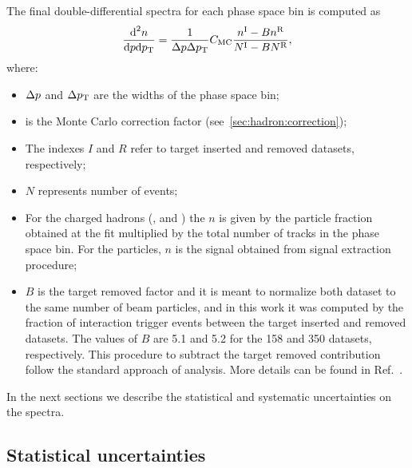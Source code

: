 The final double-differential spectra for each
phase space bin is computed as
\begin{equation}
  \frac{\text{d}^2n}{\text{d}p\text{d}p_\text{T}} = \frac{1}{\Delta p\Delta p_\text{T}} \mbox{$C_\text{MC}$}
  \frac{n^\text{I}-Bn^\text{R}}{N^\text{I}-BN^\text{R}},
  \label{eq:hadron:spec}
\end{equation}
where:
\begin{itemize}

\item $\Delta p$ and $\Delta p_\text{T}$ are the widths of the phase space bin;

\item \cmc is the Monte Carlo correction factor (see~\cref{sec:hadron:correction});

\item The indexes $I$ and $R$ refer to target inserted and removed datasets, respectively;
  
\item $N$ represents number of events;

\item  For the charged hadrons (\pions, \kaons and \protons)
the $n$ is given by the particle fraction obtained at the \dedx fit multiplied
by the total number of tracks in the phase space bin.
For the \vzero particles, $n$ is the signal obtained
from signal extraction procedure;

\item $B$ is the target removed factor and it is meant to normalize both dataset to the same
number of beam particles, and in this work it was computed by the
fraction of interaction trigger events between
the target inserted and removed datasets. The values of $B$ are 5.1 and 5.2
for the 158 and 350 \GeVc datasets, respectively. 
This procedure to subtract
the target removed contribution follow the standard approach
of \NASixtyOne analysis. More details can be found in Ref.~\cite{AntoniMThesis}.
  
\end{itemize}


In the next sections we describe the statistical and systematic
uncertainties on the spectra.

\subsection{Statistical uncertainties}
\label{sec:hadron:spec:stat}

